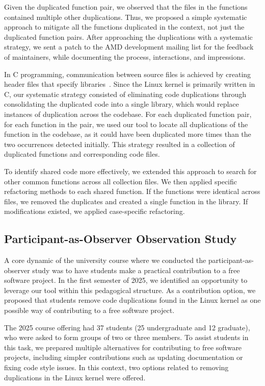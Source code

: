 \documentclass[10pt,conference]{IEEEtran}
\begin{document}
Given the duplicated function pair, we observed that the files in the functions contained multiple other duplications. Thus, we proposed a simple systematic approach to mitigate all the functions duplicated in the context, not just the duplicated function pairs. After approaching the duplications with a systematic strategy, we sent a patch to the AMD development mailing list for the feedback of maintainers, while documenting the process, interactions, and impressions.

In C programming, communication between source files is achieved by creating header files that specify libraries~\cite{Cbook}. Since the Linux kernel is primarily written in C, our systematic strategy consisted of eliminating code duplications through consolidating the duplicated code into a single library, which would replace instances of duplication across the codebase. For each duplicated function pair, for each function in the pair, we used our tool to locate all duplications of the function in the codebase, as it could have been duplicated more times than the two occurrences detected initially. This strategy resulted in a collection of duplicated functions and corresponding code files.

To identify shared code more effectively, we extended this approach to search for other common functions across all collection files. We then applied specific refactoring methods to each shared function. If the functions were identical across files, we removed the duplicates and created a single function in the library. If modifications existed, we applied case-specific refactoring.

\subsection{Participant-as-Observer Observation Study}

A core dynamic of the university course where we conducted the participant-as-observer study was to have students make a practical contribution to a free software project. In the first semester of 2025, we identified an opportunity to leverage our tool within this pedagogical structure. As a contribution option, we proposed that students remove code duplications found in the Linux kernel as one possible way of contributing to a free software project.

The 2025 course offering had 37 students (25 undergraduate and 12 graduate), who were asked to form groups of two or three members. To assist students in this task, we prepared multiple alternatives for contributing to free software projects, including simpler contributions such as updating documentation or fixing code style issues. In this context, two options related to removing duplications in the Linux kernel were offered.
\end{document}
